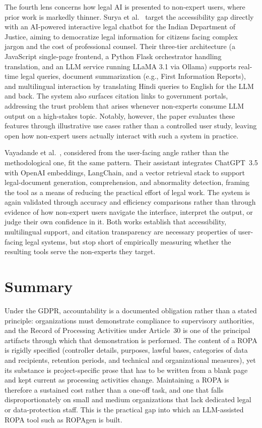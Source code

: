 The fourth lens concerns how legal AI is presented to non-expert users, where prior work is markedly thinner. Surya et al.\ \cite{suryaAIPoweredInteractiveLegal2025} target the accessibility gap directly with an AI-powered interactive legal chatbot for the Indian Department of Justice, aiming to democratize legal information for citizens facing complex jargon and the cost of professional counsel. Their three-tier architecture (a JavaScript single-page frontend, a Python Flask orchestrator handling translation, and an LLM service running LLaMA 3.1 via Ollama) supports real-time legal queries, document summarization (e.g., First Information Reports), and multilingual interaction by translating Hindi queries to English for the LLM and back. The system also surfaces citation links to government portals, addressing the trust problem that arises whenever non-experts consume LLM output on a high-stakes topic. Notably, however, the paper evaluates these features through illustrative use cases rather than a controlled user study, leaving open how non-expert users actually interact with such a system in practice.

Vayadande et al.~\cite{vayadandeAIPoweredLegalDocumentation2024}, considered from the user-facing angle rather than the methodological one, fit the same pattern. Their assistant integrates ChatGPT~3.5 with OpenAI embeddings, LangChain, and a vector retrieval stack to support legal-document generation, comprehension, and abnormality detection, framing the tool as a means of reducing the practical effort of legal work. The system is again validated through accuracy and efficiency comparisons rather than through evidence of how non-expert users navigate the interface, interpret the output, or judge their own confidence in it. Both works establish that accessibility, multilingual support, and citation transparency are necessary properties of user-facing legal systems, but stop short of empirically measuring whether the resulting tools serve the non-experts they target.


\section{Summary}
\label{sec:background-summary}

Under the GDPR, accountability is a documented obligation rather than a stated principle: organizations must demonstrate compliance to supervisory authorities, and the Record of Processing Activities under Article~30 is one of the principal artifacts through which that demonstration is performed. The content of a ROPA is rigidly specified (controller details, purposes, lawful bases, categories of data and recipients, retention periods, and technical and organizational measures), yet its substance is project-specific prose that has to be written from a blank page and kept current as processing activities change. Maintaining a ROPA is therefore a sustained cost rather than a one-off task, and one that falls disproportionately on small and medium organizations that lack dedicated legal or data-protection staff. This is the practical gap into which an LLM-assisted ROPA tool such as ROPAgen is built.

